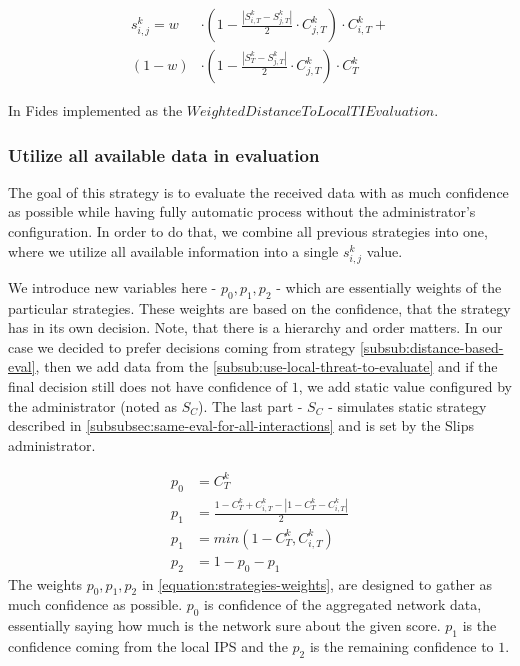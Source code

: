 \begin{equation}
\begin{split}
    s^{k}_{i, j} = w &\cdot \left(1 - \frac{|{S}^{k}_{i, T} - S^{k}_{j, T}|}{2} \cdot C^{k}_{j, T}\right) \cdot C^{k}_{i, T} + \\
    (1-w) &\cdot \left(1 - \frac{|{S}^{k}_{T} - S^{k}_{j, T}|}{2} \cdot C^{k}_{j, T}\right) \cdot C^{k}_{T}
\end{split}
\end{equation}

\noindent
In Fides implemented as the $WeightedDistanceToLocalTIEvaluation$.

\subsubsection{Utilize all available data in evaluation}
The goal of this strategy is to evaluate the received data with as much confidence as possible while having fully automatic process without the administrator's configuration.
In order to do that, we combine all previous strategies into one, where we utilize all available information into a single $s^{k}_{i, j}$ value.

We introduce new variables here - $p_{0}, p_{1}, p_{2}$ - which are essentially weights of the particular strategies. These weights are based on the confidence, that the strategy has in its own decision.
Note, that there is a hierarchy and order matters. 
In our case we decided to prefer decisions coming from strategy \ref{subsub:distance-based-eval}, then we add data from the \ref{subsub:use-local-threat-to-evaluate} and if the final decision still does not have confidence of $1$, we add static value configured by the administrator (noted as $S_{C}$). 
The last part - $S_{C}$ - simulates static strategy described in \ref{subsubsec:same-eval-for-all-interactions} and is set by the Slips administrator.

\begin{equation}
\label{equation:strategies-weights}
\begin{split}
    p_{0} &= {C}^{k}_{T} \\
    p_{1} &= \frac{1 - {C}^{k}_{T} + {C}^{k}_{i, T} - |1 - {C}^{k}_{T} - {C}^{k}_{i, T}|}{2} \\
    p_{1} &= min(1 - {C}^{k}_{T}, {C}^{k}_{i, T}) \\
    p_{2} &= 1 - p_{0} - p_{1}
\end{split}
\end{equation}
The weights $p_{0}, p_{1}, p_{2}$ in \ref{equation:strategies-weights}, are designed to gather as much confidence as possible. $p_{0}$ is confidence of the aggregated network data, essentially saying how much is the network sure about the given score. 
$p_{1}$ is the confidence coming from the local IPS and the $p_{2}$ is the remaining confidence to $1$.

